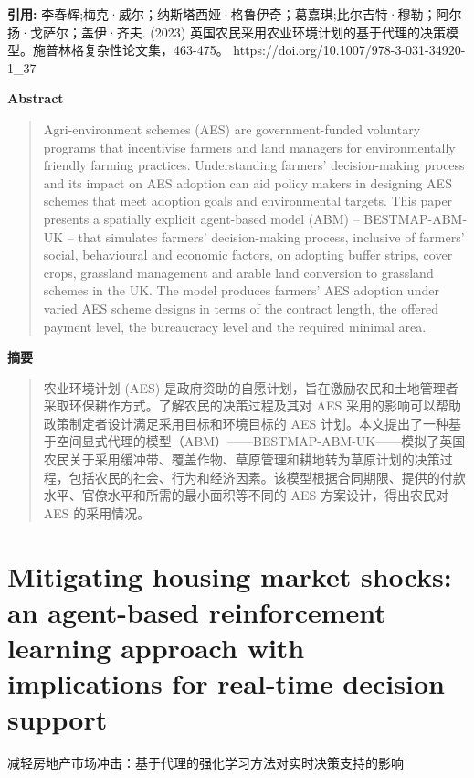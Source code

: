\vspace{0.5em}
\noindent\textbf{引用:} 李春辉;梅克·威尔；纳斯塔西娅·格鲁伊奇；葛嘉琪;比尔吉特·穆勒；阿尔扬·戈萨尔；盖伊·齐夫. (2023) 英国农民采用农业环境计划的基于代理的决策模型。施普林格复杂性论文集，463-475。 https://doi.org/10.1007/978-3-031-34920-1\_37

\vspace{1.5em}
\noindent\textbf{Abstract}\par
\begin{quote}\small
Agri-environment schemes (AES) are government-funded voluntary programs that incentivise farmers and land managers for environmentally friendly farming practices. Understanding farmers' decision-making process and its impact on AES adoption can aid policy makers in designing AES schemes that meet adoption goals and environmental targets. This paper presents a spatially explicit agent-based model (ABM) -- BESTMAP-ABM-UK -- that simulates farmers' decision-making process, inclusive of farmers' social, behavioural and economic factors, on adopting buffer strips, cover crops, grassland management and arable land conversion to grassland schemes in the UK. The model produces farmers' AES adoption under varied AES scheme designs in terms of the contract length, the offered payment level, the bureaucracy level and the required minimal area.
\end{quote}

\noindent\textbf{摘要}\par
\begin{quote}\small
农业环境计划 (AES) 是政府资助的自愿计划，旨在激励农民和土地管理者采取环保耕作方式。了解农民的决策过程及其对 AES 采用的影响可以帮助政策制定者设计满足采用目标和环境目标的 AES 计划。本文提出了一种基于空间显式代理的模型（ABM）——BESTMAP-ABM-UK——模拟了英国农民关于采用缓冲带、覆盖作物、草原管理和耕地转为草原计划的决策过程，包括农民的社会、行为和经济因素。该模型根据合同期限、提供的付款水平、官僚水平和所需的最小面积等不同的 AES 方案设计，得出农民对 AES 的采用情况。
\end{quote}

\vspace{0.5em}
\chapter{Mitigating housing market shocks: an agent-based reinforcement learning approach with implications for real-time decision support}
\begin{center}\small 减轻房地产市场冲击：基于代理的强化学习方法对实时决策支持的影响\end{center}


